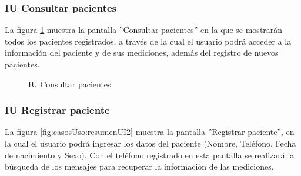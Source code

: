 \subsubsection{IU Consultar pacientes}
La figura \ref{fig:casosUso:resumenUI1} muestra la pantalla ''Consultar pacientes'' en la que se mostrarán todos los pacientes registrados, a través de la cual el usuario podrá acceder a la información del paciente y de sus mediciones, además del registro de nuevos pacientes.

\begin{figure}[htpb!]
	\begin{center}
		\caption{IU Consultar pacientes \label{fig:casosUso:resumenUI1}}
	\end{center}
\end{figure}


\subsubsection{IU Registrar paciente}
La figura \ref{fig:casosUso:resumenUI2} muestra la pantalla ''Registrar paciente'', en la cual el usuario podrá ingresar los datos del paciente (Nombre, Teléfono, Fecha de nacimiento y Sexo). Con el teléfono registrado en esta pantalla se realizará la búsqueda de los mensajes para recuperar la información de las mediciones.

